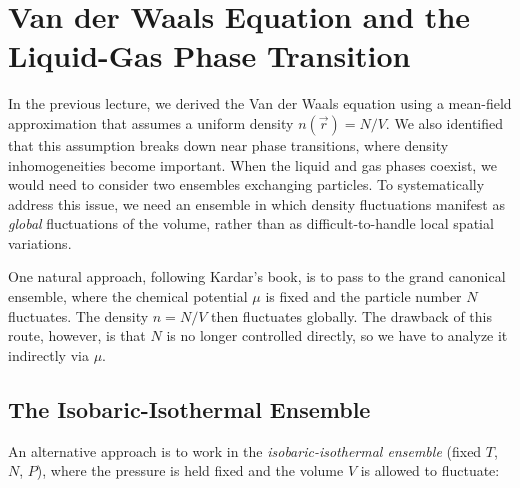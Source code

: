 \chapter{Van der Waals Equation and the Liquid-Gas Phase Transition}

In the previous lecture, we derived the Van der Waals equation using a mean-field approximation that assumes a uniform density $n(\vec{r}) = N/V$. We also identified that this assumption breaks down near phase transitions, where density inhomogeneities become important. When the liquid and gas phases coexist, we would need to consider two ensembles exchanging particles. To systematically address this issue, we need an ensemble in which density fluctuations manifest as \emph{global} fluctuations of the volume, rather than as difficult-to-handle local spatial variations.

One natural approach, following Kardar's book, is to pass to the grand canonical ensemble, where the chemical potential $\mu$ is fixed and the particle number $N$ fluctuates. The density $n = N/V$ then fluctuates globally. The drawback of this route, however, is that $N$ is no longer controlled directly, so we have to analyze it indirectly via $\mu$.

\section{The Isobaric-Isothermal Ensemble}

An alternative approach is to work in the \emph{isobaric-isothermal ensemble} (fixed $T$, $N$, $P$), where the pressure is held fixed and the volume $V$ is allowed to fluctuate:

